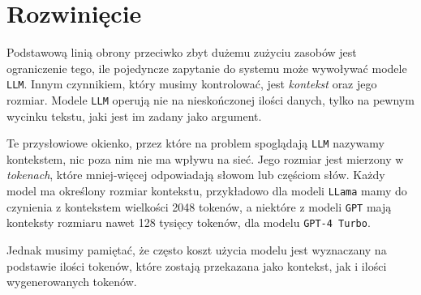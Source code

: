 \documentclass[12pt,aspectratio=169]{beamer}
\begin{document}
\section{Rozwinięcie}
\begin{frame}
Podstawową linią obrony przeciwko zbyt dużemu zużyciu zasobów jest ograniczenie
tego, ile pojedyncze zapytanie do systemu może wywoływać modele \texttt{LLM}.
Innym czynnikiem, który musimy kontrolować, jest \emph{kontekst} oraz jego
rozmiar. Modele \texttt{LLM} operują nie na nieskończonej ilości danych, tylko
na pewnym wycinku tekstu, jaki jest im zadany jako argument.
\end{frame}

\begin{frame}
Te przysłowiowe okienko, przez które na problem spoglądają \texttt{LLM} nazywamy 
kontekstem, nic poza nim nie ma wpływu na sieć. Jego rozmiar jest mierzony w
\emph{tokenach}, które mniej-więcej odpowiadają słowom lub częściom słów. Każdy
model ma określony rozmiar kontekstu, przykładowo dla modeli \texttt{LLama} mamy
do czynienia z kontekstem wielkości 2048 tokenów, a niektóre z modeli
\texttt{GPT} mają konteksty rozmiaru nawet 128 tysięcy tokenów, dla modelu
\texttt{GPT-4 Turbo}.
\end{frame}

\begin{frame}
Jednak musimy pamiętać, że często koszt użycia modelu jest wyznaczany na
podstawie ilości tokenów, które zostają przekazana jako kontekst, jak i ilości
wygenerowanych tokenów.
\end{frame}
\end{document}
